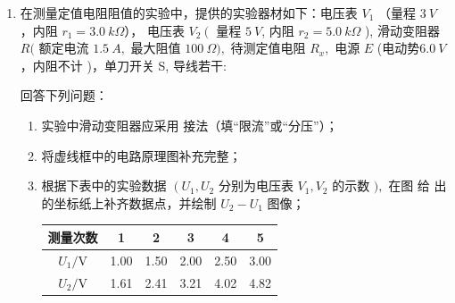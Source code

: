 \begin{enumerate}
\begin{enumerate}
\begin{enumerate}
\end{enumerate}







\end{enumerate}


\item 
在测量定值电阻阻值的实验中，提供的实验器材如下：电压表 $V_{1}$ （量程 $3 \ V$ ，内阻
$r_{1}=3.0  \ k \Omega$）， 电压表 $V_{2}\left(\right.$ 量程 $5 \ V$, 内阻 $r_{2}=5.0 \ k \Omega$ ), 滑动变阻器 $R($ 额定电流 $1.5 \ A,$
最大阻值 $100 \ \Omega),$ 待测定值电阻 $R_{x},$ 电源 $E$ (电动势$  6.0 \ V $，内阻不计 )，单刀开关 S, 导线若干:

回答下列问题： 
\begin{enumerate}
	\item
实验中滑动变阻器应采用 \underlinegap 接法（填“限流”或“分压”）； 


\item 
将虚线框中的电路原理图补充完整；
\begin{figure}[h!]
	\centering
	
\end{figure}

\item 
根据下表中的实验数据 $\left(U_{1}, U_{2}\right.$ 分别为电压表 $V_{1}, V_{2}$ 的示数 $),$ 在图  给
出的坐标纸上补齐数据点，并绘制 $U_{2}-U_{1}$ 图像；



\begin{table}[h!]
 \centering 
\begin{tabular}{|c|c|c|c|c|c|}
	\hline 测量次数 & 1 & 2 & 3 & 4 & 5 \\
	\hline$U_{1} / \mathrm{V}$ & 1.00 & 1.50 & 2.00 & 2.50 & 3.00 \\
	\hline$U_{2} / \mathrm{V}$ & 1.61 & 2.41 & 3.21 & 4.02 & 4.82 \\
	\hline
\end{tabular}
 \end{table} 

\begin{figure}[h!]
	\centering
\begin{subfigure}{0.4\linewidth}
	\centering
	 
	\caption{}\label{2020海南15a}
\end{subfigure}
\begin{subfigure}{0.4\linewidth}
	\centering
	 
	\caption{}\label{2020海南15b}
\end{subfigure}


\end{figure}
\end{enumerate}
\end{enumerate}
